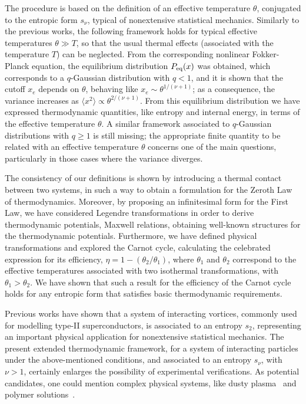\documentclass[showpacs,preprintnumbers,amsmath,amssymb,eqsecnum]{revtex4}
\begin{document}
The procedure is based on the definition of an effective
temperature $\theta$, conjugated to the entropic form $s_{\nu}$,
typical of nonextensive statistical mechanics.
Similarly to the previous works, the following framework holds
for typical effective temperatures $\theta \gg T$, so that
the usual thermal effects (associated with the temperature $T$)
can be neglected.
From the corresponding nonlinear Fokker-Planck equation,
the equilibrium distribution $P_{\rm eq}(x)$ was obtained,
which corresponds to a $q$-Gaussian distribution with $q<1$,
and it is shown that the cutoff $x_{e}$ depends on $\theta$,
behaving like $x_{e} \sim \theta^{1/(\nu+1)}$;
as a consequence, the variance
increases as $\langle x^2 \rangle \propto \theta^{2/(\nu+1)}$.
From this equilibrium distribution we have expressed thermodynamic
quantities, like entropy and internal energy, in terms of
the effective temperature $\theta$.
A similar framework associated to $q$-Gaussian distributions
with $q \geq 1$ is still missing; the appropriate finite quantity
to be related with an effective temperature $\theta$
concerns one of the main questions, particularly in those cases
where the variance diverges.

The consistency of our definitions is shown by introducing a thermal
contact between two systems, in such a way to obtain a formulation
for the Zeroth Law of thermodynamics. Moreover,
by proposing an infinitesimal form for the First Law,
we have considered Legendre transformations in order to
derive thermodynamic potentials, Maxwell relations,
obtaining well-known structures for the thermodynamic potentials.
Furthermore, we have defined physical
transformations and explored the Carnot cycle, calculating the celebrated
expression for its efficiency, $\eta=1-(\theta_2/\theta_1)$,
where $\theta_1$ and $\theta_2$ correspond to the effective temperatures
associated with two isothermal transformations,
with $\theta_1>\theta_2$.
We have shown that such a result for the efficiency of the Carnot cycle
holds for any entropic form that satisfies basic thermodynamic requirements.

Previous works have shown that a system of interacting vortices,
commonly used for modelling type-II superconductors,
is associated to an entropy $s_{2}$,
representing an important physical application for nonextensive
statistical mechanics.
The present extended thermodynamic framework,
for a system of interacting particles under the above-mentioned
conditions, and associated to an entropy $s_{\nu}$, with $\nu>1$,
certainly enlarges the possibility of experimental verifications.
As potential candidates, one could mention complex physical systems,
like dusty plasma~\cite{shukla,goree,sheridan,morfill} and
polymer solutions~\cite{teraoka}.
\end{document}
